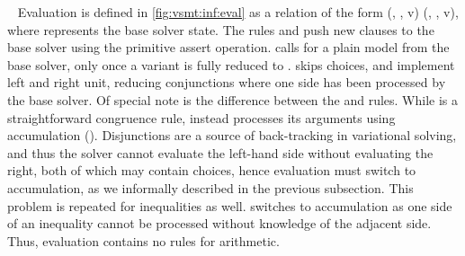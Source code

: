 ~\label{section:vsmt:evaluation}
%
Evaluation is defined in \autoref{fig:vsmt:inf:eval} as a relation of the form
(\aStore{}, \eStore{}, v) \evaluation{} (\aStore{}, \eStore{}, v), where
\eStore{} represents the base solver state. The rules  and
 push new clauses to the base solver using the primitive assert
operation.  calls for a plain model from the base solver,
only once a variant is fully reduced to \unit{}.  skips
choices,  and  implement left and right unit,
reducing conjunctions where one side has been processed by the base solver. Of
special note is the difference between the  and
 rules. While  is a straightforward congruence
rule,  instead processes its arguments using accumulation
(\accumulation{}). Disjunctions are a source of back-tracking in variational
solving, and thus the solver cannot evaluate the left-hand side without
evaluating the right, both of which may contain choices, hence evaluation must
switch to accumulation, as we informally described in the previous subsection.
This problem is repeated for inequalities as well.  switches
to accumulation as one side of an inequality cannot be processed without
knowledge of the adjacent side. Thus, evaluation contains no rules for
arithmetic.